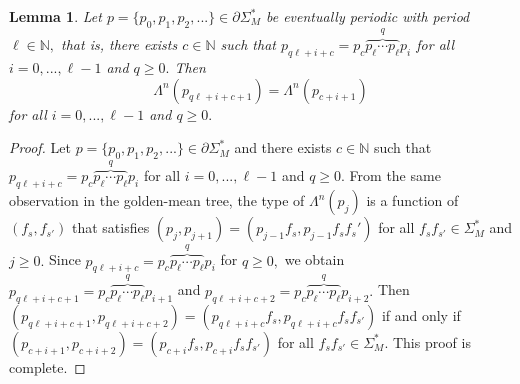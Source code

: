 \documentclass{amsart}
\newtheorem{lemma}[theorem]{Lemma}
\theoremstyle{definition}
\begin{document}
\begin{lemma}\label{lemma 2}
Let $p=\{p_0,p_1,p_2,...\}\in\partial\Sigma_M^*$ be eventually periodic with period $\ell\in\mathbb{N},$ that is, there exists $c\in\mathbb{N}$ such that $p_{q\ell+i+c}=p_c\overbrace{p_\ell\cdots p_\ell}^{q}p_i$ for all $i=0,...,\ell-1$ and $q\geq 0.$ Then 
    \[
    \Lambda^n(p_{q\ell+i+c+1})=\Lambda^n(p_{c+i+1})
    \]
    for all $i=0,...,\ell -1$ and $q\geq 0.$ 
\end{lemma}

\begin{proof}
    Let $p=\{p_0,p_1,p_2,...\}\in\partial\Sigma_M^*$ and there exists $c\in\mathbb{N}$ such that $p_{q\ell+i+c}=p_c\overbrace{p_\ell\cdots p_\ell}^{q}p_i$ for all $i=0,...,\ell-1$ and $q\geq 0.$ From the same observation in the golden-mean tree, the type of $\Lambda^n(p_j)$ is a function of $(f_s,f_{s'})$ that satisfies $(p_j,p_{j+1})=(p_{j-1}f_s,p_{j-1}f_sf_s')$ for all $f_sf_{s'}\in\Sigma_M^*$ and $j\geq 0.$ Since $p_{q\ell+i+c}=p_c\overbrace{p_\ell\cdots p_\ell}^{q}p_i$ for $q\geq 0,$ we obtain $p_{q\ell+i+c+1}=p_c\overbrace{p_\ell\cdots p_\ell}^{q}p_{i+1}$ and $p_{q\ell+i+c+2}=p_c\overbrace{p_\ell\cdots p_\ell}^{q}p_{i+2}.$ Then $(p_{q\ell+i+c+1},p_{q\ell+i+c+2})=(p_{q\ell+i+c}f_s,p_{q\ell+i+c}f_sf_{s'})$ if and only if $(p_{c+i+1},p_{c+i+2})=(p_{c+i}f_{s},p_{c+i}f_sf_{s'})$ for all $f_sf_{s'}\in\Sigma_M^*.$ This proof is complete. 
\end{proof}
\end{document}
